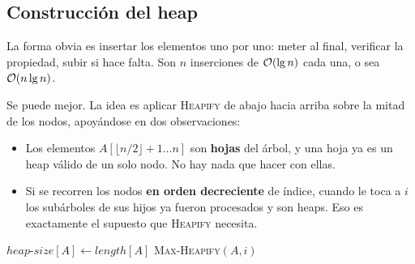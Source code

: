 \documentclass[11pt,letterpaper]{article}
\begin{document}

\subsection*{Construcción del heap}

La forma obvia es insertar los elementos uno por uno: meter al final,
verificar la propiedad, subir si hace falta. Son $n$ inserciones de
$\mathcal{O}\!\left(\lg n\right)$ cada una, o sea $\mathcal{O}\!\left(n \lg n\right)$.

Se puede mejor. La idea es aplicar \textsc{Heapify} de abajo hacia
arriba sobre la mitad de los nodos, apoyándose en dos observaciones:

\begin{itemize}[itemsep=0.2em]
  \item Los elementos $A[\lfloor n/2 \rfloor + 1 \ldots n]$ son
        \textbf{hojas} del árbol, y una hoja ya es un heap válido de
        un solo nodo. No hay nada que hacer con ellas.
  \item Si se recorren los nodos \textbf{en orden decreciente} de
        índice, cuando le toca a $i$ los subárboles de sus hijos ya
        fueron procesados y son heaps. Eso es exactamente el supuesto
        que \textsc{Heapify} necesita.
\end{itemize}

\begin{algorithm}[H]
\caption{\textsc{Build-Max-Heap}$(A)$}
\begin{algorithmic}[1]
\State $\mathit{heap\text{-}size}[A] \gets \mathit{length}[A]$
  \State \textsc{Max-Heapify}$(A, i)$
\EndFor
\end{algorithmic}
\end{algorithm}
\end{document}
